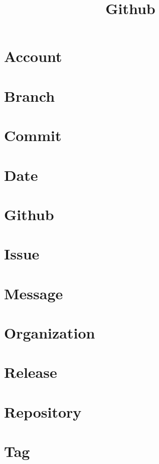 \documentclass{article}
\begin{document}
\title{Github}
\author{}
\maketitle
\tableofcontents

\section{Account}

\section{Branch}

\section{Commit}

\section{Date}

\section{Github}

\section{Issue}

\section{Message}

\section{Organization}

\section{Release}

\section{Repository}

\section{Tag}

\end{document}
